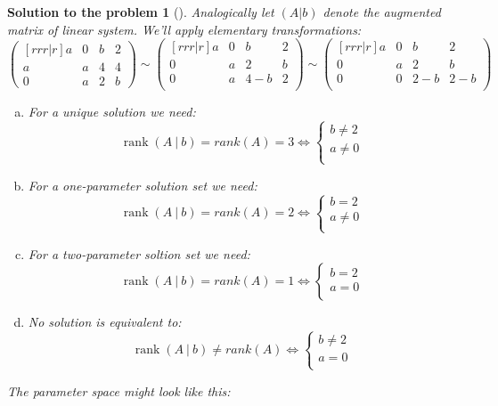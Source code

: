 \documentclass[12pt,a4]{article}
\newtheorem{solution}{Solution to the problem}
\newcommand\rank{\operatorname{rank}}
\begin{document}
\begin{solution}[]\rm Analogically let $(A|b)$ denote the augmented matrix of linear system. We'll apply elementary transformations:\\
\[
\begin{pmatrix}[rrr|r]
a & 0 & b & 2\\
a & a & 4 & 4\\
0 & a & 2 & b
\end{pmatrix}
\sim
\begin{pmatrix}[rrr|r]
a & 0 & b & 2\\
0 & a & 2 & b\\
0 & a & 4-b & 2\\
\end{pmatrix}
\sim
\begin{pmatrix}[rrr|r]
a & 0 & b & 2\\
0 & a & 2 & b\\
0 & 0 & 2-b & 2-b\\
\end{pmatrix}
\]
\begin{enumerate}[(a)]
\item For a unique solution we need:
\[
\rank(A~|~b) = rank(A) = 3 \Leftrightarrow 
\left\{\begin{matrix}
b \neq 2\\
a \neq 0\\
\end{matrix}\right.
\]
\item For a one-parameter solution set we need:
\[
\rank(A~|~b) = rank(A) = 2 \Leftrightarrow 
\left\{\begin{matrix}
b = 2\\
a \neq 0\\
\end{matrix}\right.
\]
\item For a two-parameter soltion set we need:
\[
\rank(A~|~b) = rank(A) = 1 \Leftrightarrow 
\left\{\begin{matrix}
b = 2\\
a = 0\\
\end{matrix}\right.
\]
\item No solution is equivalent to:
\[
\rank(A~|~b) \neq rank(A) \Leftrightarrow 
\left\{\begin{matrix}
b \neq 2\\
a = 0\\
\end{matrix}\right.
\]
\end{enumerate}
The parameter space might look like this:


\end{solution}
\end{document}
